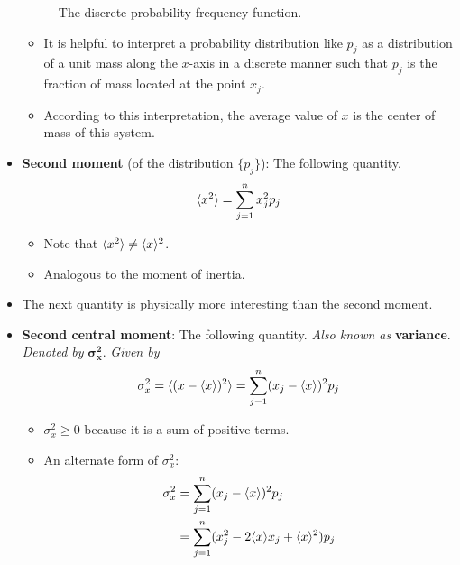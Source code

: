 \documentclass[../notes.tex]{subfiles}
\begin{document}
\begin{itemize}
\begin{figure}[h!]
        \caption{The discrete probability frequency function.}
        \label{fig:discreteProbabilityDensity}
    \end{figure}
    \begin{itemize}
        \item It is helpful to interpret a probability distribution like $p_j$ as a distribution of a unit mass along the $x$-axis in a discrete manner such that $p_j$ is the fraction of mass located at the point $x_j$.
        \item According to this interpretation, the average value of $x$ is the center of mass of this system.
    \end{itemize}
    \item \textbf{Second moment} (of the distribution $\{p_j\}$): The following quantity.
    \begin{equation*}
        \langle{x^2}\rangle = \sum_{j=1}^nx_j^2p_j
    \end{equation*}
    \begin{itemize}
        \item Note that $\langle{x^2}\rangle\neq\langle{x}\rangle^2$.
        \item Analogous to the moment of inertia.
    \end{itemize}
    \item The next quantity is physically more interesting than the second moment.
    \item \textbf{Second central moment}: The following quantity. \emph{Also known as} \textbf{variance}. \emph{Denoted by} $\bm{\sigma_x^2}$. \emph{Given by}
    \begin{equation*}
        \sigma_x^2 = \langle{(x-\langle{x}\rangle)^2}\rangle = \sum_{j=1}^n(x_j-\langle{x}\rangle)^2p_j
    \end{equation*}
    \begin{itemize}
        \item $\sigma_x^2\geq 0$ because it is a sum of positive terms.
        \item An alternate form of $\sigma_x^2$:
        \begin{align*}
            \sigma_x^2 &= \sum_{j=1}^n(x_j-\prb{x})^2p_j\\
            &= \sum_{j=1}^n(x_j^2-2\prb{x}x_j+\prb{x}^2)p_j\\

\end{align*}
\end{itemize}
\end{itemize}
\end{document}
